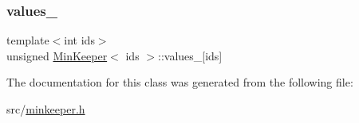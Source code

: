 \mbox{\label{classMinKeeper_a7096c3993486cb56ee56b7434282a5cc}} 
\subsubsection{\texorpdfstring{values\+\_\+}{values\_}}
{\footnotesize\ttfamily template$<$int ids$>$ \\
unsigned \hyperlink{classMinKeeper}{Min\+Keeper}$<$ ids $>$\+::values\+\_\+\mbox{[}ids\mbox{]}\hspace{0.3cm}{\ttfamily [private]}}



The documentation for this class was generated from the following file\+:\begin{DoxyCompactItemize}
\item 
src/\hyperlink{minkeeper_8h}{minkeeper.\+h}\end{DoxyCompactItemize}
